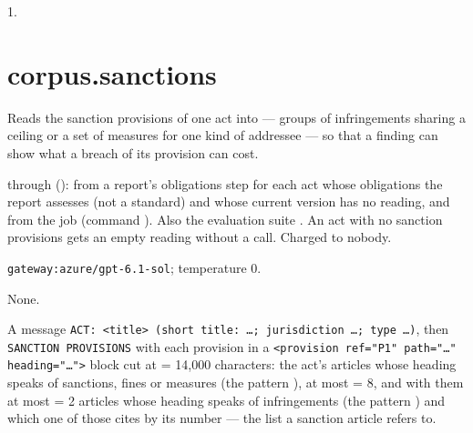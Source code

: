  1.


\section{corpus.sanctions}\label{sec:aprompts:corpus-sanctions}

 Reads the sanction provisions of one act into  ---
groups of infringements sharing a ceiling or a set of measures for one kind of addressee --- so
that a finding can show what a breach of its provision can cost.

  through 
(): from a report's obligations step for each act whose obligations
the report assesses (not a standard) and whose current version has no reading, and from the job 
(command ). Also the evaluation suite . An act with no
sanction provisions gets an empty reading without a call. Charged to nobody.

 \texttt{gateway:azure/gpt-6.1-sol}; temperature 0.

 None.

 A message \texttt{ACT: <title> (short title: …; jurisdiction …; type …)}, then \texttt{SANCTION PROVISIONS} with each provision in a
\texttt{<provision ref="P1" path="…" heading="…">} block cut at  = 14{,}000
characters: the act's articles whose heading speaks of sanctions, fines or measures (the
pattern ), at most  = 8, and with them at most
 = 2 articles whose heading speaks of infringements (the pattern
) and which one of those cites by its number --- the list a sanction article
refers to.

